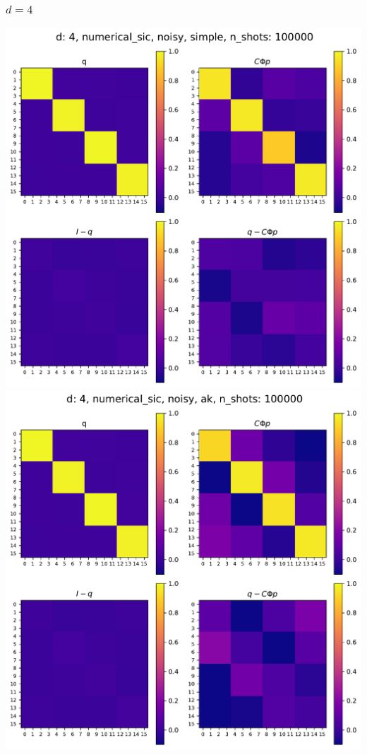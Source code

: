\documentclass{beamer}
\begin{document}
\begin{frame}
\frametitle{$d=4$}
\begin{center}
\includegraphics[scale=0.25]{img/q_d4_numerical_sic_noisy_simple_n100000}\includegraphics[scale=0.25]{img/q_d4_numerical_sic_noisy_ak_n100000}		
\end{center}
\end{frame}
\end{document}
